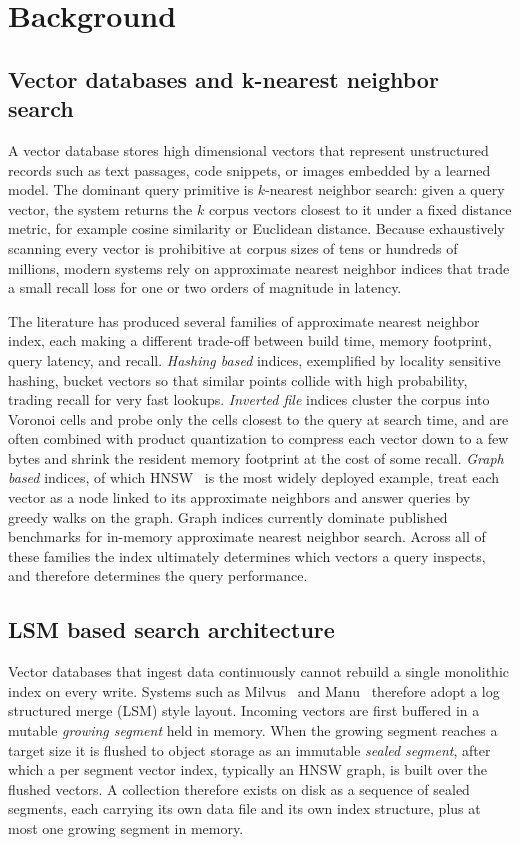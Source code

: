\section{Background}
\label{sec:background}

\subsection{Vector databases and k-nearest neighbor search}

A vector database stores high dimensional vectors that represent
unstructured records such as text passages, code snippets, or images
embedded by a learned model. The dominant query primitive is
$k$-nearest neighbor search: given a query vector, the system returns
the $k$ corpus vectors closest to it under a fixed distance metric, for
example cosine similarity or Euclidean distance. Because exhaustively
scanning every vector is prohibitive at corpus sizes of tens or
hundreds of millions, modern systems rely on approximate nearest
neighbor indices that trade a small recall loss for one or two orders
of magnitude in latency.

The literature has produced several families of approximate nearest
neighbor index, each making a different trade-off between build
time, memory footprint, query latency, and recall.
\emph{Hashing based} indices, exemplified by locality sensitive
hashing, bucket vectors so that similar points collide with high
probability, trading recall for very fast lookups.
\emph{Inverted file} indices cluster the corpus into Voronoi cells
and probe only the cells closest to the query at search time, and
are often combined with product quantization to compress each
vector down to a few bytes and shrink the resident memory footprint
at the cost of some recall. \emph{Graph based} indices, of which
HNSW~\cite{malkov2018hnsw} is the most widely deployed example,
treat each vector as a node linked to its approximate neighbors and
answer queries by greedy walks on the graph. Graph indices
currently dominate published benchmarks for in-memory approximate
nearest neighbor search. Across all of these families the
index ultimately determines which vectors a query inspects, and
therefore determines the query performance.

\subsection{LSM based search architecture}

Vector databases that ingest data continuously cannot rebuild a single
monolithic index on every write. Systems such as
Milvus~\cite{wang2021milvus} and Manu~\cite{guo2022manu} therefore
adopt a log structured merge (LSM) style layout. Incoming vectors are
first buffered in a mutable \emph{growing segment} held in memory.
When the growing segment reaches a target size it is flushed to object
storage as an immutable \emph{sealed segment}, after which a per
segment vector index, typically an HNSW graph, is built over the
flushed vectors. A collection therefore exists on disk as a sequence of
sealed segments, each carrying its own data file and its own index
structure, plus at most one growing segment in memory.

